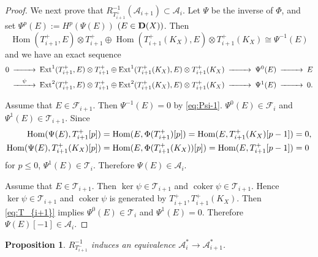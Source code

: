 \documentclass[leqno,11pt]{amsart}
\def\Ext{\mathop{\mathrm{Ext}}\nolimits}
\def\Hom{\mathop{\mathrm{Hom}}\nolimits}
\def\coker{\mathop{\mathrm{coker}}\nolimits}
\newtheorem{Prop}[Thm]{Proposition}
\theoremstyle{definition}
\def\AA{\ensuremath{\mathcal A}}
\def\FF{\ensuremath{\mathcal F}}
\def\TT{\ensuremath{\mathcal T}}
\begin{document}
\begin{proof}
We next prove that $R_{T_{i+1}^+}^{-1}(\AA_{i+1}) \subset \AA_i$.
Let $\Psi$ be the inverse of $\Phi$, and set
$\Psi^p(E):=H^p(\Psi(E))$ $(E \in {\bf D}(X))$.
Then
\begin{equation}\label{eq:Psi-1}
\Hom(T_{i+1}^+,E) \otimes T_{i+1}^+ \oplus
\Hom(T_{i+1}^+(K_X),E) \otimes T_{i+1}^+(K_X) \cong \Psi^{-1}(E)
\end{equation}
and we have an exact sequence
\begin{equation}
\begin{CD}
0 @>>> \Ext^1(T_{i+1}^+,E) \otimes T_{i+1}^+ \oplus
\Ext^1(T_{i+1}^+(K_X),E) \otimes T_{i+1}^+(K_X) @>>> \Psi^0(E) @>>>E \\
 @>{\psi}>> \Ext^2(T_{i+1}^+,E) \otimes T_{i+1}^+ \oplus
\Ext^2(T_{i+1}^+(K_X),E) \otimes T_{i+1}^+(K_X) @>>> \Psi^1(E) @>>>0.
\end{CD}
\end{equation}

Assume that 
$E \in \FF_{i+1}$.
Then $\Psi^{-1}(E)=0$ by \eqref{eq:Psi-1}.
$\Psi^0(E) \in \FF_i$ and $\Psi^1(E) \in \TT_{i+1}$.
Since
\begin{equation}\label{eq:T_{i+1}}
\begin{split}
\Hom(\Psi(E),T_{i+1}^+[p])& =\Hom(E,\Phi(T_{i+1}^+)[p])=
\Hom(E, T_{i+1}^+(K_X)[p-1])=0,\\
\Hom(\Psi(E),T_{i+1}^+(K_X)[p])& =\Hom(E,\Phi(T_{i+1}^+(K_X))[p])=
\Hom(E, T_{i+1}^+[p-1])=0
\end{split}
\end{equation}
for $p \leq 0$,
$\Psi^1(E) \in \TT_i$.
Therefore $\Psi(E) \in \AA_i$.



Assume that $E \in \TT_{i+1}$.
Then $\ker \psi \in \TT_{i+1}$ and
$\coker \psi \in \TT_{i+1}$.
Hence $\ker \psi \in \TT_{i+1}$ and
$\coker \psi$ is generated by $T_{i+1}^+,T_{i+1}^+(K_X)$. 
Then \eqref{eq:T_{i+1}} implies $\Psi^0(E) \in \TT_i$ and
$\Psi^1(E)=0$.
Therefore $\Psi(E)[-1] \in \AA_i$.
\end{proof}






\begin{Prop}\label{Prop:equiv2}
$R_{T_{i+1}^-}^{-1}$ induces an equivalence
$\AA_i^* \to \AA_{i+1}^*$.
\end{Prop}
\end{document}
